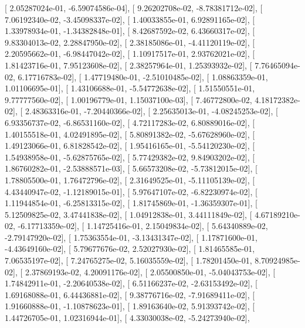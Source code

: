 \documentclass{article}
\begin{document}
       [  2.05287024e-01,  -6.59074586e-04],
       [  9.26202708e-02,  -8.78381712e-02],
       [  7.06192340e-02,  -3.45098337e-02],
       [  1.40033855e-01,   6.92891165e-02],
       [  1.33978934e-01,  -1.34382848e-01],
       [  8.42687592e-02,   6.43660317e-02],
       [  9.83304013e-02,   2.28847950e-02],
       [  2.38185086e-01,  -4.41120119e-02],
       [  2.20595662e-01,  -6.98447042e-02],
       [  1.10917517e-01,   2.93762021e-02],
       [  1.81423716e-01,   7.95123608e-02],
       [  2.38257964e-01,   1.25393932e-02],
       [  7.76465094e-02,   6.17716783e-02],
       [  1.47719480e-01,  -2.51010485e-02],
       [  1.08863359e-01,   1.01106695e-01],
       [  1.43106688e-01,  -5.54772638e-02],
       [  1.51550551e-01,   9.77777560e-02],
       [  1.00196779e-01,   1.15037100e-03],
       [  7.46772800e-02,   4.18172382e-02],
       [  2.48363316e-01,  -7.20440366e-02],
       [  2.25635013e-01,  -4.08245253e-02],
       [  6.93356737e-02,  -6.86531160e-02],
       [  4.72117283e-02,   6.80889016e-02],
       [  1.40155518e-01,   4.02491895e-02],
       [  5.80891382e-02,  -5.67628960e-02],
       [  1.49123066e-01,   6.81828542e-02],
       [  1.95416165e-01,  -5.54120230e-02],
       [  1.54938958e-01,  -5.62875765e-02],
       [  5.77429382e-02,   9.84903202e-02],
       [  1.86760282e-01,  -2.53888571e-03],
       [  5.66573208e-02,  -5.73812015e-02],
       [  1.78805500e-01,   1.76472796e-02],
       [  2.31649525e-01,  -5.11105139e-02],
       [  4.43440947e-02,  -1.12189015e-01],
       [  5.97647107e-02,  -6.82230974e-02],
       [  1.11944854e-01,  -6.25813315e-02],
       [  1.81745869e-01,  -1.36359307e-01],
       [  5.12509825e-02,   3.47441838e-02],
       [  1.04912838e-01,   3.44111849e-02],
       [  4.67189210e-02,  -6.17713359e-02],
       [  1.14725416e-01,   2.15049834e-02],
       [  5.64340889e-02,  -2.79147920e-02],
       [  1.75363554e-01,  -3.13431347e-02],
       [  1.17871600e-01,  -4.43649160e-02],
       [  5.79677676e-02,   2.52027930e-02],
       [  1.81465585e-01,   7.06535197e-02],
       [  7.24765275e-02,   5.16035559e-02],
       [  1.78201450e-01,   8.70924985e-02],
       [  2.37869193e-02,   4.20091176e-02],
       [  2.05500850e-01,  -5.04043753e-02],
       [  1.74842911e-01,  -2.20640538e-02],
       [  6.51166237e-02,  -2.63153492e-02],
       [  1.69168088e-01,   6.44436881e-02],
       [  9.38776716e-02,  -7.91689411e-02],
       [  1.91660888e-01,  -1.10878623e-01],
       [  1.89163640e-02,   5.91393742e-02],
       [  1.44726705e-01,   1.02316944e-01],
       [  4.33030038e-02,  -5.24273940e-02],
\end{document}
